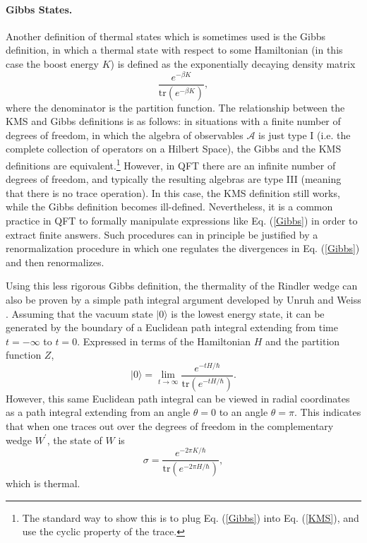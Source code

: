 \documentclass[12pt]{article}
\begin{document}
\paragraph{Gibbs States.} Another definition of thermal states which is sometimes used is the Gibbs definition, in which a thermal state with respect to some Hamiltonian (in this case the boost energy $K$) is defined as the exponentially decaying density matrix
\begin{equation}\label{Gibbs}
\frac{e^{-\beta K}}{\mathrm{tr}(e^{-\beta K})},
\end{equation}
where the denominator is the partition function.  The relationship between the KMS and Gibbs definitions is as follows: in situations with a finite number of degrees of freedom, in which the algebra of observables $\mathcal{A}$ is just type I (i.e. the complete collection of operators on a Hilbert Space), the Gibbs and the KMS definitions are equivalent.\footnote{The standard way to show this is to plug Eq. (\ref{Gibbs}) into Eq. (\ref{KMS}), and use the cyclic property of the trace.}  However, in QFT there are an infinite number of degrees of freedom, and typically the resulting algebras are type III (meaning that there is no trace operation).  In this case, the KMS definition still works, while the Gibbs definition becomes ill-defined.  Nevertheless, it is a common practice in QFT to formally manipulate expressions like Eq. (\ref{Gibbs}) in order to extract finite answers.  Such procedures can in principle be justified by a renormalization procedure in which one regulates the divergences in Eq. (\ref{Gibbs}) and then renormalizes.

Using this less rigorous Gibbs definition, the thermality of the Rindler wedge can also be proven by a simple path integral argument developed by Unruh and Weiss \cite{UW84}.  Assuming that the vacuum state $|0\rangle$ is the lowest energy state, it can be generated by the boundary of a Euclidean path integral extending from time $t = -\infty$ to $t = 0$.  Expressed in terms of the Hamiltonian $H$ and the partition function $Z$,
\begin{equation}
|0\rangle = \lim_{t \to \infty} \frac{e^{- tH / \hbar}}{\mathrm{tr}(e^{- tH / \hbar})}.
\end{equation}
However, this same Euclidean path integral can be viewed in radial coordinates as a path integral extending from an angle $\theta = 0$ to an angle $\theta = \pi$.  This indicates that when one traces out over the degrees of freedom in the complementary wedge $W^\prime$, the state of $W$ is
\begin{equation}
\sigma = \frac{e^{-2 \pi K/\hbar}}{\mathrm{tr}(e^{- 2\pi H / \hbar})},
\end{equation}
which is thermal.
\end{document}
